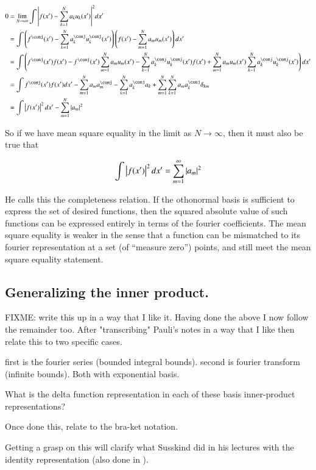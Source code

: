 \documentclass{article}
\begin{document}
\begin{align*}
0 &= \lim_{N \rightarrow \infty}\int 
{\Abs{f(x') -\sum_{k=1}^N a_k u_k(x') }}^2 dx'  \\
&=
\int \left(f^\conj(x') -\sum_{k=1}^N a_k^\conj u_k^\conj(x') \right) \left(f(x') - \sum_{m=1}^N a_m u_m(x') \right) 
dx' \\
&=
\int 
\left( f^\conj(x') f(x') 
-f^\conj(x') \sum_{m=1}^N a_m u_m(x') 
- \sum_{k=1}^N a_k^\conj u_k^\conj(x') f(x') 
+ \sum_{m=1}^N a_m u_m(x') \sum_{k=1}^N a_k^\conj u_k^\conj(x')  \right)
dx' \\
&=
\int f^\conj(x') f(x') dx'
- \sum_{m=1}^N a_m a_m^\conj
- \sum_{k=1}^N a_k^\conj a_k
+ \sum_{m=1}^N \sum_{k=1}^N a_m a_k^\conj \delta_{km} \\
&= \int \Abs{f(x')}^2 dx' - \sum_{m=1}^N \Abs{a_m}^2 \\
\end{align*}

So if we have mean square equality in the limit as $N \rightarrow \infty$, then it must also be true that

\begin{align*}
\int \left\lvert{f(x')}\right\rvert^2 dx' = \sum_{m=1}^\infty \left\lvert{a_m}\right\rvert^2 \\
\end{align*}

He calls this the completeness relation.  If the othonormal basis is sufficient to express the set of desired functions, then
the squared absolute value of such functions can be expressed entirely in terms of the fourier coefficients.  The mean square
equality is weaker in the sense that a function can be mismatched to its fourier representation at a set (of ``measure zero'') points,
and still meet the mean square equality statement.

\subsection{ Generalizing the inner product. }

FIXME: write this up in a way that I like it.  Having done the above I now follow the remainder too.  After "transcribing" Pauli's
notes in a way that I like then relate this to two specific cases.

first is the fourier series (bounded integral bounds).  second is fourier transform (infinite bounds).  Both with exponential basis.

What is the delta function representation in each of these basis inner-product representations?

Once done this, relate to the bra-ket notation.

Getting a grasp on this will clarify what Susskind did in his lectures with the identity representation (also done in \cite{mcmahon2005qmd}).



\end{document}
